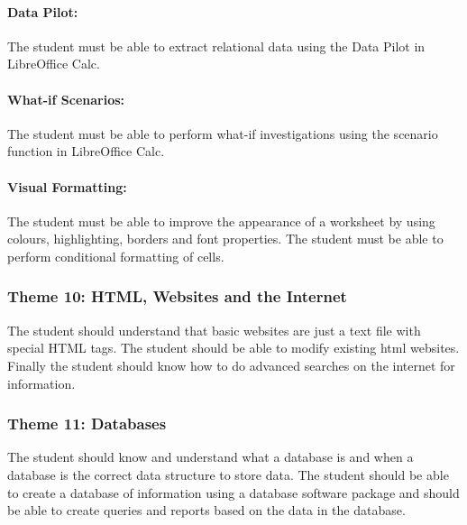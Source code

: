             \paragraph{Data Pilot:}
                The student must be able to extract relational data using the Data
                Pilot in LibreOffice Calc.

            \paragraph{What-if Scenarios:}
                The student must be able to perform what-if investigations using
                the scenario function in LibreOffice Calc.

            \paragraph{Visual Formatting:}
                The student must be able to improve the appearance of a worksheet
                by using colours, highlighting, borders and font properties. The
                student must be able to perform conditional formatting of cells.
        
            
        \subsubsection{Theme 10: HTML, Websites and the Internet}
            The student should understand that basic websites are just a 
            text file with special HTML tags. The student should be able to 
            modify existing html websites. Finally the student should know 
            how to do advanced searches on the internet for information.
        

        \subsubsection{Theme 11: Databases}
            The student should know and understand what a database is and when a 
            database is the correct data structure to store data. The student 
            should be able to create a database of information using a database 
            software package and should be able to create queries and reports 
            based on the data in the database.